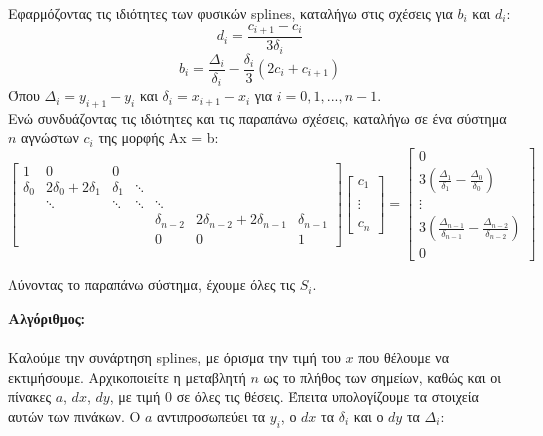 \documentclass[a4paper,11pt]{article}
\newcommand{\lt}{\latintext}
\newcommand{\gt}{\greektext}
\begin{document}
{\begin{description}
Εφαρμόζοντας τις ιδιότητες των φυσικών {\lt splines}, καταλήγω στις σχέσεις για $b_i$ και $d_i$:
    \lt
    \begin{equation}
        d_i = \frac{c_{i+1}-c_i}{3\delta_i} \tag{5.3}\label{eq:di}
    \end{equation}
    \begin{equation}
        b_i = \frac{\Delta_i}{\delta_i} - \frac{\delta_i}{3}(2c_i+c_{i+1}) \tag{5.4}\label{eq:bi}
    \end{equation}
    \gt
Όπου $\Delta_i = y_{i+1} - y_i$ και $\delta_i = x_{i+1} - x_i$ για $i=0,1,...,n-1$.\\
Ενώ συνδυάζοντας τις ιδιότητες και τις παραπάνω σχέσεις, καταλήγω σε ένα σύστημα $n$ αγνώστων $c_i$ της μορφής {\lt Ax = b}:\\
    \begin{equation*}
    \begin{bmatrix}
    1 & 0 & 0\\
    \delta_0 & 2\delta_0+2\delta_1 & \delta_1 & \ddots\\
    &\ddots & \ddots & \ddots & \ddots \\
    & & & & \delta_{n-2} & 2\delta_{n-2}+2\delta_{n-1} & \delta_{n-1} \\
    & & & & 0 & 0 & 1
    \end{bmatrix}
    \begin{bmatrix}
    c_1\\
    \\
    \vdots \\
    \\
    c_n
    \end{bmatrix}
    =     
    \begin{bmatrix}
    0\\
    3(\frac{\Delta_1}{\delta_1}-\frac{\Delta_0}{\delta_0})\\
    \vdots \\
    3(\frac{\Delta_{n-1}}{\delta_{n-1}}-\frac{\Delta_{n-2}}{\delta_{n-2}})\\
    0
    \end{bmatrix}
    \tag{5.5}\label{eq:ci}
    \end{equation*}
    
Λύνοντας το παραπάνω σύστημα, έχουμε όλες τις $S_i$.

\textbf{Αλγόριθμος:}\\\\
Καλούμε την συνάρτηση {\lt splines}, με όρισμα την τιμή του $x$ που θέλουμε να εκτιμήσουμε. Αρχικοποιείτε η μεταβλητή $n$ ως το πλήθος των σημείων, καθώς και οι πίνακες $a$, $dx$, $dy$, με τιμή 0 σε όλες τις θέσεις. Έπειτα υπολογίζουμε τα στοιχεία αυτών των πινάκων. Ο $a$ αντιπροσωπεύει τα $y_i$, ο $dx$ τα $\delta_i$ και ο $dy$ τα $\Delta_i$: 


\end{description}}
\end{document}
